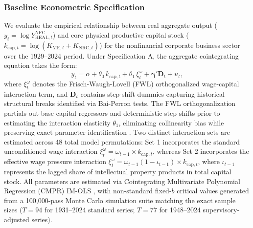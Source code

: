 \subsubsection{Baseline Econometric Specification}
We evaluate the empirical relationship between real aggregate output ($y_t = \log Y_{\text{REAL},t}^{\text{NFC}}$) and core physical productive capital stock ($k_{\text{cap},t} = \log(K_{\text{ME},t} + K_{\text{NRC},t})$) for the nonfinancial corporate business sector over the 1929--2024 period. Under Specification A, the aggregate cointegrating equation takes the form:
\begin{equation}
	y_t = \alpha + \theta_0\, k_{\text{cap},t} + \theta_1\, \xi^{\omega}_t + \boldsymbol{\gamma}' \mathbf{D}_t + u_t,
	\label{eq:431:specA_model}
\end{equation}
where $\xi^{\omega}_t$ denotes the Frisch-Waugh-Lovell (FWL) orthogonalized wage-capital interaction term, and $\mathbf{D}_t$ contains step-shift dummies capturing historical structural breaks identified via Bai-Perron tests. The FWL orthogonalization partials out base capital regressors and deterministic step shifts prior to estimating the interaction elasticity $\theta_1$, eliminating collinearity bias while preserving exact parameter identification \citep{VogelsangWagner2014}. Two distinct interaction sets are estimated across 48 total model permutations: Set 1 incorporates the standard unconditioned wage interaction $\xi^{\omega}_t = \omega_{t-1} \times k_{\text{cap},t}$, whereas Set 2 incorporates the effective wage pressure interaction $\xi^{\omega}_t = \omega_{t-1}(1 - \iota_{t-1}) \times k_{\text{cap},t}$, where $\iota_{t-1}$ represents the lagged share of intellectual property products in total capital stock. All parameters are estimated via Cointegrating Multivariate Polynomial Regression (CMPR) IM-OLS \citep{VogelsangWagner2014}, with non-standard fixed-$b$ critical values generated from a 100,000-pass Monte Carlo simulation suite matching the exact sample sizes ($T = 94$ for 1931--2024 standard series; $T = 77$ for 1948--2024 supervisory-adjusted series).

